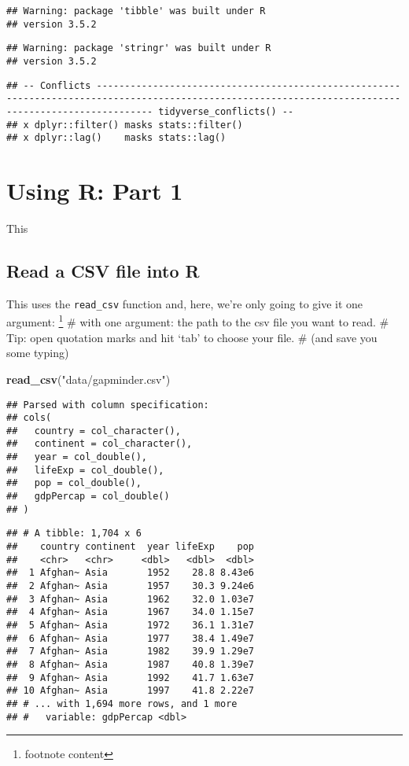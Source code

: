\documentclass[]{tufte-handout}
\newenvironment{Shaded}{}{}
\newcommand{\KeywordTok}[1]{\textcolor[rgb]{0.00,0.44,0.13}{\textbf{#1}}}
\newcommand{\NormalTok}[1]{#1}
\newcommand{\StringTok}[1]{\textcolor[rgb]{0.25,0.44,0.63}{#1}}
\begin{document}
\begin{verbatim}
## Warning: package 'tibble' was built under R
## version 3.5.2
\end{verbatim}

\begin{verbatim}
## Warning: package 'stringr' was built under R
## version 3.5.2
\end{verbatim}

\begin{verbatim}
## -- Conflicts ------------------------------------------------------------------------------------------------------------------------------------------------------ tidyverse_conflicts() --
## x dplyr::filter() masks stats::filter()
## x dplyr::lag()    masks stats::lag()
\end{verbatim}

\hypertarget{using-r-part-1}{%
\section{Using R: Part 1}\label{using-r-part-1}}

This

\hypertarget{read-a-csv-file-into-r}{%
\subsection{Read a CSV file into R}\label{read-a-csv-file-into-r}}

This uses the \texttt{read\_csv} function and, here, we're only going to
give it one argument: \footnote{footnote content} \# with one argument:
the path to the csv file you want to read. \# Tip: open quotation marks
and hit `tab' to choose your file. \# (and save you some typing)

\begin{Shaded}
\begin{Highlighting}[]
\KeywordTok{read_csv}\NormalTok{(}\StringTok{"data/gapminder.csv"}\NormalTok{)}
\end{Highlighting}
\end{Shaded}

\begin{verbatim}
## Parsed with column specification:
## cols(
##   country = col_character(),
##   continent = col_character(),
##   year = col_double(),
##   lifeExp = col_double(),
##   pop = col_double(),
##   gdpPercap = col_double()
## )
\end{verbatim}

\begin{verbatim}
## # A tibble: 1,704 x 6
##    country continent  year lifeExp    pop
##    <chr>   <chr>     <dbl>   <dbl>  <dbl>
##  1 Afghan~ Asia       1952    28.8 8.43e6
##  2 Afghan~ Asia       1957    30.3 9.24e6
##  3 Afghan~ Asia       1962    32.0 1.03e7
##  4 Afghan~ Asia       1967    34.0 1.15e7
##  5 Afghan~ Asia       1972    36.1 1.31e7
##  6 Afghan~ Asia       1977    38.4 1.49e7
##  7 Afghan~ Asia       1982    39.9 1.29e7
##  8 Afghan~ Asia       1987    40.8 1.39e7
##  9 Afghan~ Asia       1992    41.7 1.63e7
## 10 Afghan~ Asia       1997    41.8 2.22e7
## # ... with 1,694 more rows, and 1 more
## #   variable: gdpPercap <dbl>
\end{verbatim}
\end{document}

